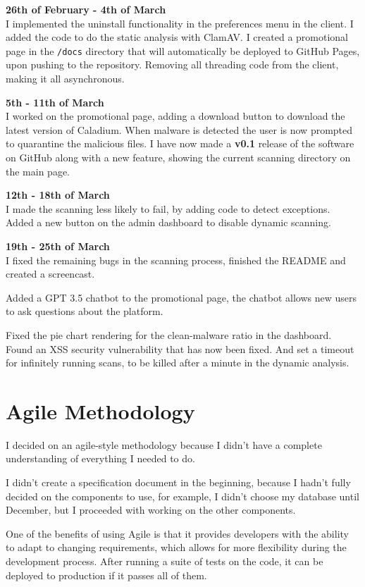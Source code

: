 \textbf{26th of February - 4th of March} \\
I implemented the uninstall functionality in the preferences menu in the client.
I added the code to do the static analysis with ClamAV.
I created a promotional page in the \texttt{/docs} directory
that will automatically be deployed to GitHub Pages,
upon pushing to the repository.
Removing all threading code from the client, making it all asynchronous.

\textbf{5th - 11th of March} \\
I worked on the promotional page, adding a download button to
download the latest version of Caladium.
When malware is detected the user is now
prompted to quarantine the malicious files.
I have now made a \textbf{v0.1} release of the software on GitHub
along with a new feature, showing the current scanning directory on the main page.

\textbf{12th - 18th of March} \\
I made the scanning less likely to fail, by adding code to detect exceptions.
Added a new button on the admin dashboard to disable dynamic scanning.

\textbf{19th - 25th of March} \\
I fixed the remaining bugs in the scanning process,
finished the README and created a screencast.

Added a GPT 3.5 chatbot to the promotional page,
the chatbot allows new users to ask questions about the platform.

Fixed the pie chart rendering for the clean-malware ratio in the dashboard.
Found an XSS security vulnerability that has now been fixed.
And set a timeout for infinitely running scans,
to be killed after a minute in the dynamic analysis.

\section{Agile Methodology}
I decided on an agile-style methodology because
I didn't have a complete understanding of everything I needed to do.

I didn't create a specification document in the beginning,
because I hadn't fully decided on the components to use,
for example, I didn't choose my database until December,
but I proceeded with working on the other components.

One of the benefits of using Agile is that it provides developers
with the ability to adapt to changing requirements,
which allows for more flexibility during the development process.
After running a suite of tests on the code,
it can be deployed to production if it passes all of them.

